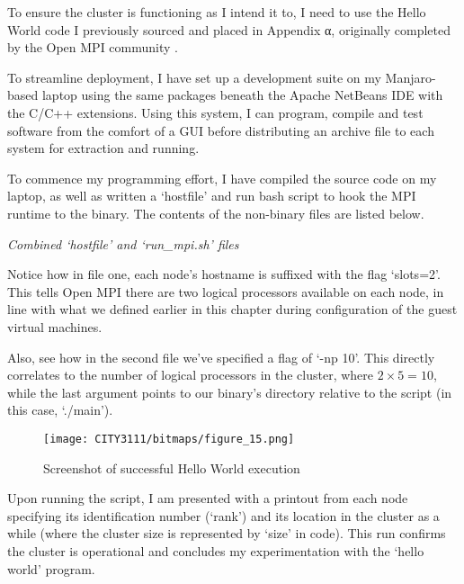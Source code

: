 \textbf{}

To ensure the cluster is functioning as I intend it to, I need to use the Hello World code I previously sourced and placed in Appendix α, originally completed by the Open MPI community \cite{open_mpi_2020}.

To streamline deployment, I have set up a development suite on my Manjaro-based laptop using the same packages beneath the Apache NetBeans IDE with the C/C++ extensions. Using this system, I can program, compile and test software from the comfort of a GUI before distributing an archive file to each system for extraction and running.

To commence my programming effort, I have compiled the source code on my laptop, as well as written a `hostfile' and run bash script to hook the MPI runtime to the binary. The contents of the non-binary files are listed below.
\vfill\break


\begin{center}
    \emph{Combined `hostfile' and `run\_mpi.sh' files}
\end{center}

Notice how in file one, each node's hostname is suffixed with the flag `slots=2'. This tells Open MPI there are two logical processors available on each node, in line with what we defined earlier in this chapter during configuration of the guest virtual machines.

Also, see how in the second file we've specified a flag of `-np 10'. This directly correlates to the number of logical processors in the cluster, where $2\times5=10$, while the last argument points to our binary's directory relative to the script (in this case, `./main').

\begin{figure}[H]
    \texttt{[image: CITY3111/bitmaps/figure\_15.png]}
    \caption{Screenshot of successful Hello World execution}
    \label{figure_15}
\end{figure}

Upon running the script, I am presented with a printout from each node specifying its identification number (`rank') and its location in the cluster as a while (where the cluster size is represented by `size' in code). This run confirms the cluster is operational and concludes my experimentation with the `hello world' program.
\vfill\break


